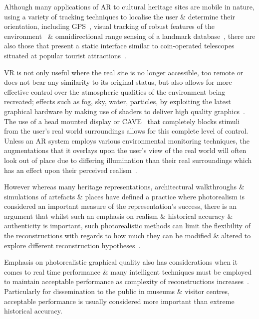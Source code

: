 Although many applications of AR to cultural heritage sites are mobile in nature, using a variety of tracking techniques to localise the user \& determine their orientation, including GPS~\cite{vlahakis:archeoguide}, visual tracking of robust features of the environment~\cite{Kim2009} \& omnidirectional range sensing of a landmark database~\cite{Taketomi2011}, there are also those that present a static interface similar to coin-operated telescopes situated at popular tourist attractions~\cite{Weng2012}.


VR is not only useful where the real site is no longer accessible, too remote or does not bear any similarity to its original status, but also allows for more effective control over the atmospheric qualities of the environment being recreated; effects such as fog, sky, water, particles, by exploiting the latest graphical hardware by making use of shaders to deliver high quality graphics~\cite{deamicis:gamebased}. The use of a head mounted display or CAVE~\cite{cabral:x3dexperience,Christou2006} that completely blocks stimuli from the user's real world surroundings allows for this complete level of control. Unless an AR system employs various environmental monitoring techniques, the augmentations that it overlays upon the user's view of the real world will often look out of place due to differing illumination than their real surroundings which has an effect upon their perceived realism~\cite{mcnamara:lightness}.

However whereas many heritage representations, architectural walkthroughs \& simulations of artefacts \& places have defined a practice where photorealism is considered an important measure of the representation's success, there is an argument that whilst such an emphasis on realism \& historical accuracy \& authenticity is important, such photorealistic methods can limit the flexibility of the reconstructions with regards to how much they can be modified \& altered to explore different reconstruction hypotheses~\cite{roussou:photorealism}.

Emphasis on photorealistic graphical quality also has considerations when it comes to real time performance \& many intelligent techniques must be employed to maintain acceptable performance as complexity of reconstructions increases~\cite{willmott:largecomplex}. Particularly for dissemination to the public in museums \& visitor centres, acceptable performance is usually considered more important than extreme historical accuracy.

